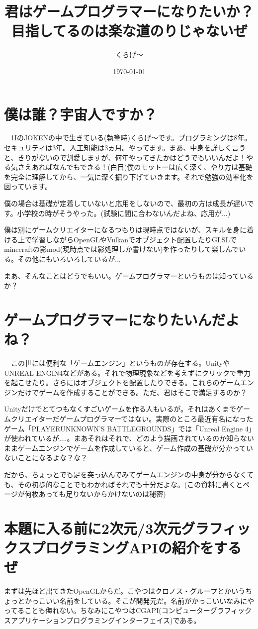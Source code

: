\documentclass[12pt,a4paper]{jsarticle}
\title{君はゲームプログラマーになりたいか？ \\ 目指してるのは楽な道のりじゃないぜ}
\author{くらげ～}
\date{\today}
\begin{document}
\maketitle
\section{僕は誰？宇宙人ですか？}
　1IのJOKENの中で生きている(執筆時)くらげ～です。プログラミングは8年。セキュリティは3年。人工知能は3ヵ月。やってます。まあ、中身を詳しく言うと、きりがないので割愛しますが、何年やってきたかはどうでもいいんだよ！やる気さえあればなんでもできる！(白目)僕のモットーは広く深く、やり方は基礎を完全に理解してから、一気に深く掘り下げていきます。それで勉強の効率化を図っています。

僕の場合は基礎が定着していないと応用をしないので、最初の方は成長が遅いです。小学校の時がそうやった。(試験に間に合わないんだよね、応用が...)

僕は別にゲームクリエイターになるつもりは現時点ではないが、スキルを身に着ける上で学習しながらOpenGLやVulkanでオブジェクト配置したりGLSLでminecraftの影mod(現時点では影処理しか書けない)を作ったりして楽しんでいる。その他にもいろいろしているが...

まあ、そんなことはどうでもいい。ゲームプログラマーというものは知っているか？


\section{ゲームプログラマーになりたいんだよね？}
　この世には便利な「ゲームエンジン」というものが存在する。UnityやUNREAL ENGIN4などがある。それで物理現象などを考えずにクリックで重力を起こせたり。さらにはオブジェクトを配置したりできる。これらのゲームエンジンだけでゲームを作成することができる。ただ、君はそこで満足するのか？

Unityだけでとてつもなくすごいゲームを作る人もいるが。それはあくまでゲームクリエイターだゲームプログラマーではない。実際のところ最近有名になったゲーム「PLAYERUNKNOWN'S BATTLEGROUNDS」では「Unreal Engine 4」が使われているが....。まあそれはそれで、どのよう描画されているのか知らないままゲームエンジンでゲームを作成していると、ゲーム作成の基礎が分かっていないことになるよな？な？

だから、ちょっとでも足を突っ込んでみてゲームエンジンの中身が分からなくても、その初歩的なことでもわかればそれでも十分だよな。(この資料に書くとページが何枚あっても足りないからかけないのは秘密)


\section{本題に入る前に2次元/3次元グラフィックスプログラミングAPIの紹介をするぜ}
 まずは先ほど出てきたOpenGLからだ。こやつはクロノス・グループとかいうちょっとかっこいい名前をしている。そこが開発元だ。名前がかっこいいなみにやってることも侮れない。ちなみにこやつはCGAPI(コンピューターグラフィックスアプリケーションプログラミングインターフェイス)である。
\end{document}
